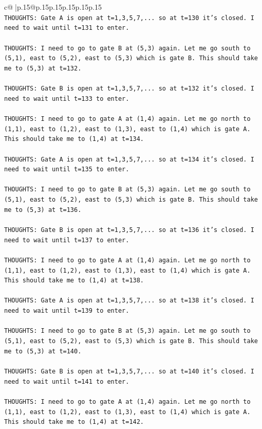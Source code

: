 \documentclass{article}
\begin{document}
{\begin{supertabular}{c@{$\;$}|p{.15\linewidth}@{}p{.15\linewidth}p{.15\linewidth}p{.15\linewidth}p{.15\linewidth}p{.15\linewidth}}
{{{\\ 
\texttt{THOUGHTS: Gate A is open at t=1,3,5,7,... so at t=130 it's closed. I need to wait until t=131 to enter.} \\
\\ 
\texttt{THOUGHTS: I need to go to gate B at (5,3) again. Let me go south to (5,1), east to (5,2), east to (5,3) which is gate B. This should take me to (5,3) at t=132.} \\
\\ 
\texttt{THOUGHTS: Gate B is open at t=1,3,5,7,... so at t=132 it's closed. I need to wait until t=133 to enter.} \\
\\ 
\texttt{THOUGHTS: I need to go to gate A at (1,4) again. Let me go north to (1,1), east to (1,2), east to (1,3), east to (1,4) which is gate A. This should take me to (1,4) at t=134.} \\
\\ 
\texttt{THOUGHTS: Gate A is open at t=1,3,5,7,... so at t=134 it's closed. I need to wait until t=135 to enter.} \\
\\ 
\texttt{THOUGHTS: I need to go to gate B at (5,3) again. Let me go south to (5,1), east to (5,2), east to (5,3) which is gate B. This should take me to (5,3) at t=136.} \\
\\ 
\texttt{THOUGHTS: Gate B is open at t=1,3,5,7,... so at t=136 it's closed. I need to wait until t=137 to enter.} \\
\\ 
\texttt{THOUGHTS: I need to go to gate A at (1,4) again. Let me go north to (1,1), east to (1,2), east to (1,3), east to (1,4) which is gate A. This should take me to (1,4) at t=138.} \\
\\ 
\texttt{THOUGHTS: Gate A is open at t=1,3,5,7,... so at t=138 it's closed. I need to wait until t=139 to enter.} \\
\\ 
\texttt{THOUGHTS: I need to go to gate B at (5,3) again. Let me go south to (5,1), east to (5,2), east to (5,3) which is gate B. This should take me to (5,3) at t=140.} \\
\\ 
\texttt{THOUGHTS: Gate B is open at t=1,3,5,7,... so at t=140 it's closed. I need to wait until t=141 to enter.} \\
\\ 
\texttt{THOUGHTS: I need to go to gate A at (1,4) again. Let me go north to (1,1), east to (1,2), east to (1,3), east to (1,4) which is gate A. This should take me to (1,4) at t=142.} \\
}}}
\end{supertabular}}
\end{document}
